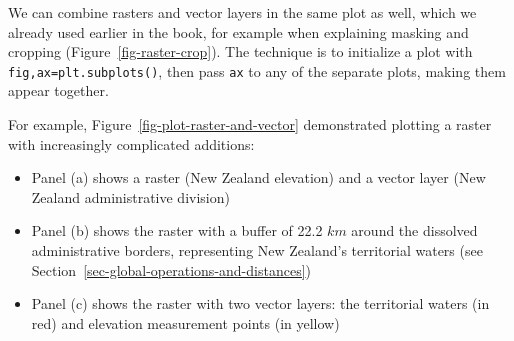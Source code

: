 \documentclass[
  letterpaper,
]{krantz}
\providecommand{\tightlist}{%
  \setlength{\itemsep}{0pt}\setlength{\parskip}{0pt}}\usepackage{longtable,booktabs,array}
\begin{document}
We can combine rasters and vector layers in the same plot as well, which
we already used earlier in the book, for example when explaining masking
and cropping (Figure~\ref{fig-raster-crop}). The technique is to
initialize a plot with \texttt{fig,ax=plt.subplots()}, then pass
\texttt{ax} to any of the separate plots, making them appear together.

For example, Figure~\ref{fig-plot-raster-and-vector} demonstrated
plotting a raster with increasingly complicated additions:

\begin{itemize}
\tightlist
\item
  Panel (a) shows a raster (New Zealand elevation) and a vector layer
  (New Zealand administrative division)
\item
  Panel (b) shows the raster with a buffer of 22.2 \(km\) around the
  dissolved administrative borders, representing New Zealand's
  territorial waters (see
  Section~\ref{sec-global-operations-and-distances})
\item
  Panel (c) shows the raster with two vector layers: the territorial
  waters (in red) and elevation measurement points (in yellow)
\end{itemize}
\end{document}
